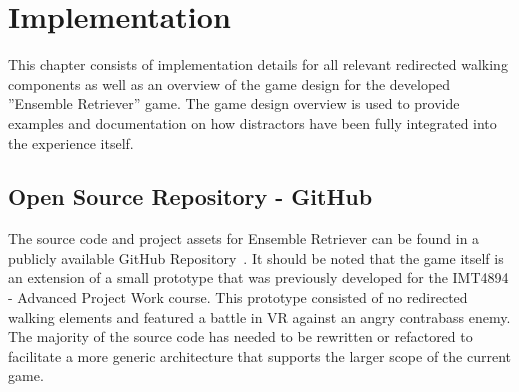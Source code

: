 \chapter{Implementation}
\label{chap:implementation}
This chapter consists of implementation details for all relevant redirected walking components as well as an overview of the game design for the developed ''Ensemble Retriever'' game. The game design overview is used to provide examples and documentation on how distractors have been fully integrated into the experience itself. 

\section{Open Source Repository - GitHub}
The source code and project assets for Ensemble Retriever can be found in a publicly available GitHub Repository~\cite{projectRepository}. It should be noted that the game itself is an extension of a small prototype that was previously developed for the IMT4894 - Advanced Project Work course. This prototype consisted of no redirected walking elements and featured a battle in VR against an angry contrabass enemy. The majority of the source code has needed to be rewritten or refactored to facilitate a more generic architecture that supports the larger scope of the current game.  

